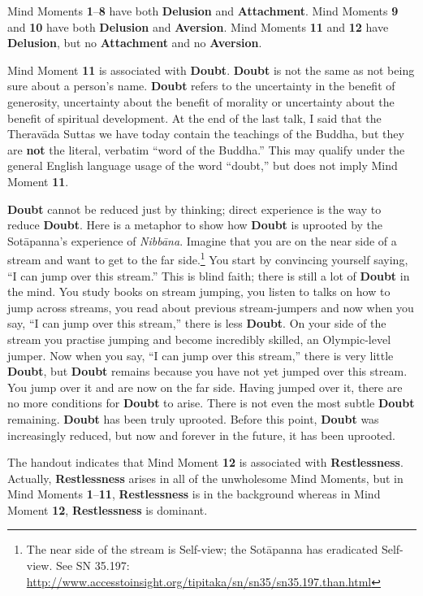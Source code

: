 Mind Moments \textbf{1}--\textbf{8} have both \textbf{Delusion} and \textbf{Attachment}. Mind Moments \textbf{9} and \textbf{10} have both \textbf{Delusion} and \textbf{Aversion}. Mind Moments \textbf{11} and \textbf{12} have \textbf{Delusion}, but no \textbf{Attachment} and no \textbf{Aversion}.

Mind Moment \textbf{11} is associated with \textbf{Doubt}. \textbf{Doubt} is not the same as not being sure about a person’s name. \textbf{Doubt} refers to the uncertainty in the benefit of generosity, uncertainty about the benefit of morality or uncertainty about the benefit of spiritual development. At the end of the last talk, I said that the Theravāda Suttas we have today contain the teachings of the Buddha, but they are \textbf{not} the literal, verbatim “word of the Buddha.” This may qualify under the general English language usage of the word “doubt,” but does not imply Mind Moment \textbf{11}.

\textbf{Doubt} cannot be reduced just by thinking; direct experience is the way to reduce \textbf{Doubt}. Here is a metaphor to show how \textbf{Doubt} is uprooted by the Sotāpanna’s experience of \textit{Nibbāna}. Imagine that you are on the near side of a stream and want to get to the far side.\footnote{The near side of the stream is Self-view; the Sotāpanna has eradicated Self-view. See SN 35.197: \url{http://www.accesstoinsight.org/tipitaka/sn/sn35/sn35.197.than.html}} You start by convincing yourself saying, “I can jump over this stream.” This is blind faith; there is still a lot of \textbf{Doubt} in the mind. You study books on stream jumping, you listen to talks on how to jump across streams, you read about previous stream-jumpers and now when you say, “I can jump over this stream,” there is less \textbf{Doubt}. On your side of the stream you practise jumping and become incredibly skilled, an Olympic-level jumper. Now when you say, “I can jump over this stream,” there is very little \textbf{Doubt}, but \textbf{Doubt} remains because you have not yet jumped over this stream. You jump over it and are now on the far side. Having jumped over it, there are no more conditions for \textbf{Doubt} to arise. There is not even the most subtle \textbf{Doubt} remaining. \textbf{Doubt} has been truly uprooted. Before this point, \textbf{Doubt} was increasingly reduced, but now and forever in the future, it has been uprooted.

The handout indicates that Mind Moment \textbf{12} is associated with \textbf{Restlessness}. Actually, \textbf{Restlessness} arises in all of the unwholesome Mind Moments, but in Mind Moments \textbf{1}--\textbf{11}, \textbf{Restlessness} is in the background whereas in Mind Moment \textbf{12}, \textbf{Restlessness} is dominant.

